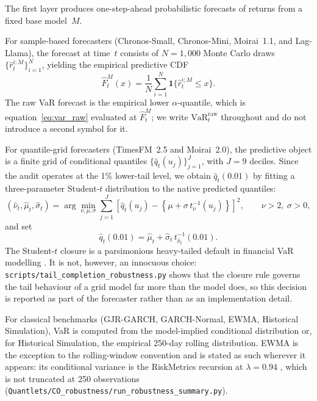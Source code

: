 \documentclass[preprint,11pt,authoryear]{elsarticle}
\newcommand{\VaR}{\mathrm{VaR}}
\newcommand{\1}{\boldsymbol{1}}
\begin{document}
The first layer produces one-step-ahead probabilistic forecasts of returns from a fixed base model~$M$.

For sample-based forecasters (Chronos-Small, Chronos-Mini, Moirai~1.1, and Lag-Llama), the forecast at time~$t$ consists of $N = 1{,}000$ Monte Carlo draws $\{\hat r_t^{i;M}\}_{i=1}^N$, yielding the empirical predictive CDF
\begin{equation}
	\label{eq:ecdf_sample}
	\widehat F_t^M(x)
	= \frac{1}{N}\sum_{i=1}^{N}
	\mathbf{1}\{\hat r_t^{i;M}\leq x\}.
\end{equation}
The raw VaR forecast is the empirical lower $\alpha$-quantile, which is
equation~\eqref{eq:var_raw} evaluated at $\widehat F_t^M$; we write
$\VaR_t^{\mathrm{raw}}$ throughout and do not introduce a second symbol for it.

For quantile-grid forecasters (TimesFM~2.5 and Moirai~2.0), the predictive object is a finite grid of conditional quantiles $\{\hat q_t(u_j)\}_{j=1}^{J}$, with $J = 9$ deciles. Since the audit operates at the 1\% lower-tail level, we obtain $\hat q_t(0.01)$ by fitting a three-parameter Student-$t$ distribution to the native predicted quantiles:
\begin{equation}
	\label{eq:tail_completion}
	(\hat\nu_t, \hat\mu_t, \hat\sigma_t)
	=
	\arg\min_{\nu, \mu, \sigma}
	\sum_{j=1}^{J}
	\left[
	\hat q_t(u_j)
	-
	\left\{
	\mu + \sigma\, t_{\nu}^{-1}(u_j)
	\right\}
	\right]^2,
	\qquad \nu > 2,\ \sigma > 0,
\end{equation}
and set
\begin{equation}
	\label{eq:var_grid}
	\hat q_t(0.01)
	=
	\hat\mu_t + \hat\sigma_t\, t_{\hat\nu_t}^{-1}(0.01).
\end{equation}
The Student-$t$ closure is a parsimonious heavy-tailed default in financial VaR modelling \citep{bollerslev1987,hansen1994autoregressive,mcneil2000estimation}. It is not, however, an innocuous choice: \texttt{scripts/tail\_completion\_robustness.py} shows that the closure rule governs the tail behaviour of a grid model far more than the model does, so this decision is reported as part of the forecaster rather than as an implementation detail.

For classical benchmarks (GJR-GARCH, GARCH-Normal, EWMA, Historical Simulation), VaR is computed from the model-implied conditional distribution or, for Historical Simulation, the empirical 250-day rolling distribution. EWMA is the exception to the rolling-window convention and is stated as such wherever it appears: its conditional variance is the RiskMetrics recursion at $\lambda = 0.94$ \citep{riskmetrics1996}, which is not truncated at 250 observations (\texttt{Quantlets/CO\_robustness/run\_robustness\_summary.py}).
\end{document}
